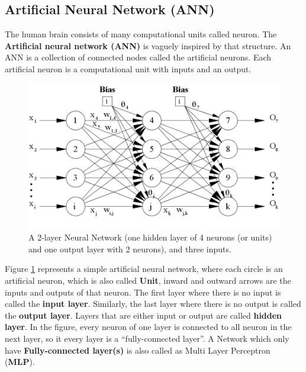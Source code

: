 \subsection{Artificial Neural Network (ANN)}
The human brain consists of many computational units called neuron. The \textbf{Artificial neural network (ANN)} is vaguely inspired by that structure. An ANN is a collection of connected nodes called the artificial neurons. Each artificial neuron is a computational unit with inputs and an output.
\begin{center}
	\begin{figure}[H]
		\centering
		\includegraphics[width=0.75\columnwidth]{images/chap2/NeuralNetwork.jpg}
		\caption{A 2-layer Neural Network (one hidden layer of 4 neurons (or units) and one output layer with 2 neurons), and three inputs.}
		\label{chap2:neural_net}
	\end{figure}
\end{center}
\vspace{-1cm}
Figure \ref{chap2:neural_net} represents a simple artificial neural network, where each circle is an artificial neuron, which is also called \textbf{Unit}, inward and outward arrows are the inputs and outputs of that neuron. The first layer where there is no input is called the \textbf{input layer}. Similarly, the last layer where there is no output is called the \textbf{output layer}. Layers that are either input or output are called \textbf{hidden layer}. In the figure, every neuron of one layer is connected to all neuron in the next layer, so it every layer is a “fully-connected layer”. A Network which only have \textbf{Fully-connected layer(s)} is also called as Multi Layer Perceptron (\textbf{MLP}).
